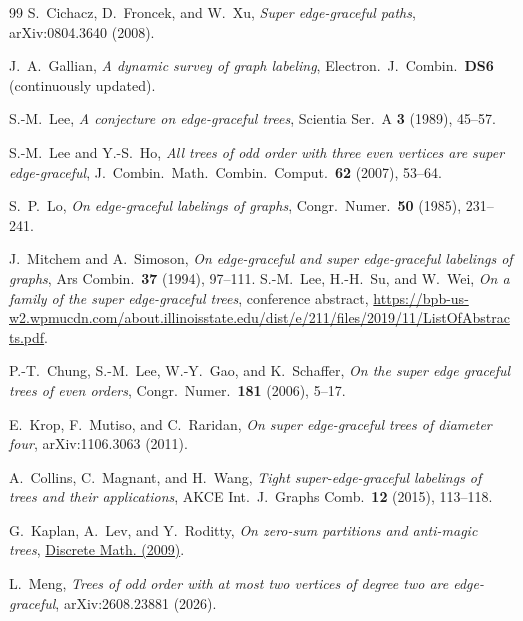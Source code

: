 \documentclass[11pt]{article}
\theoremstyle{definition}
\begin{document}
\begin{thebibliography}{99}
S.~Cichacz, D.~Froncek, and W.~Xu,
\emph{Super edge-graceful paths},
arXiv:0804.3640 (2008).

J.~A.~Gallian,
\emph{A dynamic survey of graph labeling},
Electron.\ J.\ Combin.\ \textbf{DS6} (continuously updated).

S.-M.~Lee,
\emph{A conjecture on edge-graceful trees},
Scientia Ser.\ A \textbf{3} (1989), 45--57.

S.-M.~Lee and Y.-S.~Ho,
\emph{All trees of odd order with three even vertices are super edge-graceful},
J.\ Combin.\ Math.\ Combin.\ Comput.\ \textbf{62} (2007), 53--64.

S.~P.~Lo,
\emph{On edge-graceful labelings of graphs},
Congr.\ Numer.\ \textbf{50} (1985), 231--241.

J.~Mitchem and A.~Simoson,
\emph{On edge-graceful and super edge-graceful labelings of graphs},
Ars Combin.\ \textbf{37} (1994), 97--111.
S.-M.~Lee, H.-H.~Su, and W.~Wei,
\emph{On a family of the super edge-graceful trees}, conference abstract,
\url{https://bpb-us-w2.wpmucdn.com/about.illinoisstate.edu/dist/e/211/files/2019/11/ListOfAbstracts.pdf}.

P.-T.~Chung, S.-M.~Lee, W.-Y.~Gao, and K.~Schaffer,
\emph{On the super edge graceful trees of even orders},
Congr.\ Numer.\ \textbf{181} (2006), 5--17.

E.~Krop, F.~Mutiso, and C.~Raridan,
\emph{On super edge-graceful trees of diameter four}, arXiv:1106.3063 (2011).

A.~Collins, C.~Magnant, and H.~Wang,
\emph{Tight super-edge-graceful labelings of trees and their applications},
AKCE Int.\ J.\ Graphs Comb.\ \textbf{12} (2015), 113--118.

G.~Kaplan, A.~Lev, and Y.~Roditty,
\emph{On zero-sum partitions and anti-magic trees},
\href{https://doi.org/10.1016/j.disc.2008.04.012}{Discrete Math. (2009)}.

L.~Meng, \emph{Trees of odd order with at most two vertices of degree two are edge-graceful},
arXiv:2608.23881 (2026).
\end{thebibliography}
\end{document}
